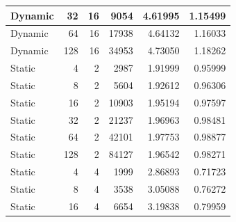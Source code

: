 \documentclass[journal,transmag]{IEEEtran}
\begin{document}
\begin{table}[h]
\begin{tabular}{|l|r|r|r|r|r|}
		Dynamic       & 32                           & 16                           & 9054                              & 4.61995                       & 1.15499                         \\ \hline
		Dynamic       & 64                           & 16                           & 17938                             & 4.64132                       & 1.16033                         \\ \hline
		Dynamic       & 128                          & 16                           & 34953                             & 4.73050                       & 1.18262                         \\ \hline
		Static        & 4                            & 2                            & 2987                              & 1.91999                       & 0.95999                         \\ \hline
		Static        & 8                            & 2                            & 5604                              & 1.92612                       & 0.96306                         \\ \hline
		Static        & 16                           & 2                            & 10903                             & 1.95194                       & 0.97597                         \\ \hline
		Static        & 32                           & 2                            & 21237                             & 1.96963                       & 0.98481                         \\ \hline
		Static        & 64                           & 2                            & 42101                             & 1.97753                       & 0.98877                         \\ \hline
		Static        & 128                          & 2                            & 84127                             & 1.96542                       & 0.98271                         \\ \hline
		Static        & 4                            & 4                            & 1999                              & 2.86893                       & 0.71723                         \\ \hline
		Static        & 8                            & 4                            & 3538                              & 3.05088                       & 0.76272                         \\ \hline
		Static        & 16                           & 4                            & 6654                              & 3.19838                       & 0.79959                         \\ \hline

\end{tabular}
\end{table}
\end{document}

